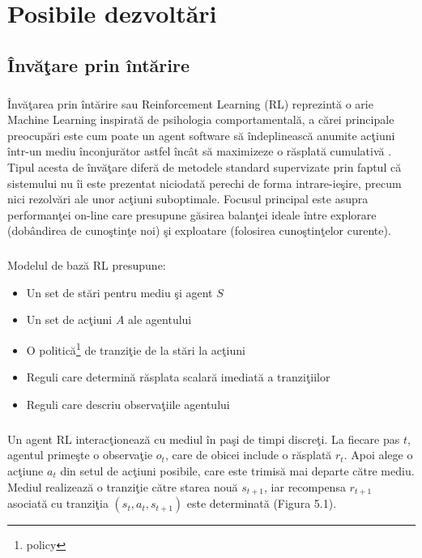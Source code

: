 \chapter{Posibile dezvolt\u ari}

\section{\^ Inv\u a\c tare prin \^ int\u arire}

\paragraph{}
\^ Inv\u a\c tarea prin \^ int\u arire sau Reinforcement Learning (RL) reprezint\u a o arie Machine Learning inspirat\u a de psihologia comportamental\u a, a c\u arei principale preocup\u ari este cum poate un agent software s\u a \^ indeplineasc\u a anumite ac\c tiuni \^ intr-un mediu \^ inconjur\u ator astfel \^ inc\^ at s\u a maximizeze o r\u asplat\u a cumulativ\u a \cite{Sutton:1998:IRL:551283}. Tipul acesta de \^ inv\u a\c tare difer\u a de metodele standard supervizate prin faptul c\u a sistemului nu \^ ii este prezentat niciodat\u a perechi de forma intrare-ie\c sire, precum nici rezolv\u ari ale unor ac\c tiuni suboptimale. Focusul principal este asupra performan\c tei on-line care presupune g\u asirea balan\c tei ideale \^ intre explorare (dob\^ andirea de cuno\c stin\c te noi) \c si exploatare (folosirea cuno\c stin\c telor curente). 

\paragraph{}
Modelul de baz\u a RL presupune:

\begin{itemize}
	\item Un set de st\u ari pentru mediu \c si agent \(S\)
	\item Un set de ac\c tiuni \(A\) ale agentului
	\item O politic\u a\footnote{policy} de tranzi\c tie de la st\u ari la ac\c tiuni
	\item Reguli care determin\u a r\u asplata scalar\u a imediat\u a a tranzi\c tiilor
	\item Reguli care descriu observa\c tiile agentului
\end{itemize}

\paragraph{}
Un agent RL interac\c tioneaz\u a cu mediul \^ in pa\c si de timpi discre\c ti. La fiecare pas \(t\), agentul prime\c ste o observa\c tie \(o_t\), care de obicei include o r\u asplat\u a \(r_t\). Apoi alege o ac\c tiune \(a_t\) din setul de ac\c tiuni posibile, care este trimis\u a mai departe c\u atre mediu. Mediul realizeaz\u a o tranzi\c tie c\u atre starea nou\u a \(s_{t+1}\), iar recompensa \(r_{t+1}\) asociat\u a cu tranzi\c tia \((s_t, a_t, s_{t+1})\) este determinat\u a (Figura 5.1).

